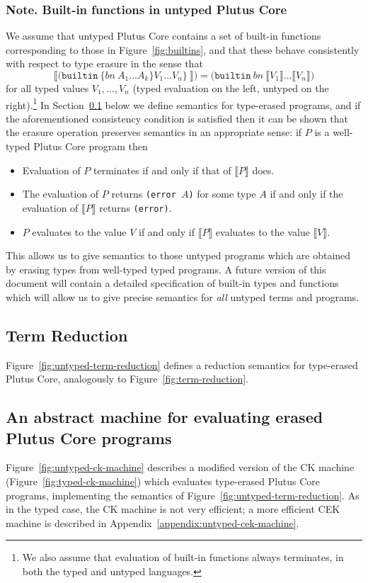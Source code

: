 \documentclass[a4paper]{article}
\newcommand{\keyword}[1]{\texttt{#1}}
\newcommand{\construct}[1]{\texttt{(} #1 \texttt{)}}
\newcommand{\builtin}[3]{\construct{\keyword{builtin} ~ \texttt{\{} \mathit{#1} ~ #2 \texttt{\}} ~ #3}}
\newcommand{\builtinU}[2]{\construct{\keyword{builtin} ~ \mathit{#1} ~ #2}}
\newcommand{\erase}[1]{\llbracket#1\rrbracket}
\begin{document}
\subsubsection{Note. Built-in functions in untyped Plutus Core}
\label{sec:untyped-ck-builtins}
We assume that untyped Plutus Core contains a set of built-in functions
corresponding to those in Figure~\ref{fig:builtins}, and that these
behave consistently with respect to type erasure in the sense that
$$
\erase{\builtin{bn}{A_1 \ldots A_k\}{V_1 \ldots V_n}}} =
\builtinU{bn}{\erase{V_1} \ldots \erase{V_n}}
$$
for all typed values $V_1, \ldots, V_n$ (typed evaluation on the left,
untyped on the right).\footnote{We also assume that evaluation of
built-in functions always terminates, in both the typed and untyped
languages.}  In Section~\ref{sec:untyped-term-reduction} below we
define semantics for type-erased programs, and if the aforementioned
consistency condition is satisfied then it can be shown that the
erasure operation preserves semantics in an appropriate sense: if $P$
is a well-typed Plutus Core program then
\begin{itemize}
\item Evaluation of $P$ terminates if and only if that of $\erase{P}$ does.
\item The evaluation of $P$ returns \texttt{(error $A$)} for some type $A$
if and only if the evaluation of $\erase{P}$ returns \texttt{(error)}.
\item $P$ evaluates to the value $V$ if and only if $\erase{P}$ evaluates to the value
$\erase{V}$.
\end{itemize}
This allows
us to give semantics to those untyped programs which are obtained by
erasing types from well-typed typed programs.  A future version of
this document will contain a detailed specification of built-in types
and functions which will allow us to give precise semantics
for \textit{all} untyped terms and programs.

\subsection{Term Reduction}
\label{sec:untyped-term-reduction}
Figure~\ref{fig:untyped-term-reduction} defines a reduction semantics
for type-erased Plutus Core, analogously to
Figure~\ref{fig:term-reduction}.



\subsection{An abstract machine for evaluating erased Plutus Core programs}
\label{sec:untyped-ck-machine}
Figure~\ref{fig:untyped-ck-machine} describes a modified version of
the CK machine (Figure~\ref{fig:typed-ck-machine}) which evaluates
type-erased Plutus Core programs, implementing the semantics of
Figure~\ref{fig:untyped-term-reduction}. As in the typed case, the CK
machine is not very efficient; a more efficient CEK machine is
described in Appendix~\ref{appendix:untyped-cek-machine}.
\end{document}
